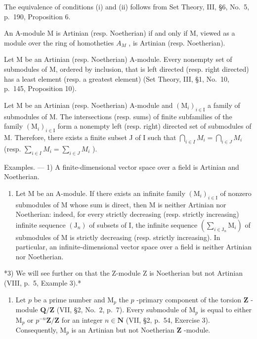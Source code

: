 The equivalence of conditions (i) and (ii) follows from Set Theory, III, §6, No.~5, p.~190, Proposition 6.

An A-module M is Artinian (resp. Noetherian) if and only if M, viewed as a module over the ring of homotheties \(A_{M}\) , is Artinian (resp. Noetherian).

Let M be an Artinian (resp. Noetherian) A-module. Every nonempty set of submodules of M, ordered by inclusion, that is left directed (resp. right directed) has a least element (resp. a greatest element) (Set Theory, III, §1, No.~10, p.~145, Proposition 10).

Let M be an Artinian (resp. Noetherian) A-module and \((\mathrm{M}_{i})_{i\in\mathrm{I}}\) a family of submodules of M. The intersections (resp. sums) of finite subfamilies of the family \((\mathrm{M}_{i})_{i\in\mathrm{I}}\) form a nonempty left (resp. right) directed set of submodules of M. Therefore, there exists a finite subset J of I such that \(\bigcap_{i\in I}M_{i}=\bigcap_{i\in J}M_{i}\) (resp. \(\sum_{i\in I}M_{i}=\sum_{i\in J}M_{i}\) ).

Examples. --- 1) A finite-dimensional vector space over a field is Artinian and Noetherian.

\begin{enumerate}
\def\labelenumi{\arabic{enumi})}
\setcounter{enumi}{1}
\tightlist
\item
  Let M be an A-module. If there exists an infinite family \((\mathrm{M}_{i})_{i\in\mathrm{I}}\) of nonzero submodules of M whose sum is direct, then M is neither Artinian nor Noetherian: indeed, for every strictly decreasing (resp. strictly increasing) infinite sequence \((\mathrm{J}_{n})\) of subsets of I, the infinite sequence \((\sum_{i\in\mathrm{J}_{n}}\mathrm{M}_{i})\) of submodules of M is strictly decreasing (resp. strictly increasing). In particular, an infinite-dimensional vector space over a field is neither Artinian nor Noetherian.
\end{enumerate}

*3) We will see further on that the Z-module Z is Noetherian but not Artinian (VIII, p.~5, Example 3).*

\begin{enumerate}
\def\labelenumi{\arabic{enumi})}
\setcounter{enumi}{3}
\tightlist
\item
  Let \(p\) be a prime number and \(\mathrm{M}_p\) the \(p\) -primary component of the torsion \(\mathbf{Z}\) -module \(\mathbf{Q} / \mathbf{Z}\) (VII, §2, No.~2, p.~7). Every submodule of \(\mathrm{M}_p\) is equal to either \(\mathrm{M}_p\) or \(p^{-n}\mathbf{Z} / \mathbf{Z}\) for an integer \(n \in \mathbf{N}\) (VII, §2, p.~54, Exercise 3). Consequently, \(\mathrm{M}_p\) is an Artinian but not Noetherian \(\mathbf{Z}\) -module.
\end{enumerate}

